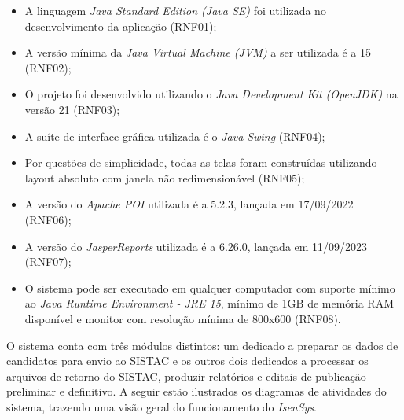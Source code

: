\documentclass[
	12pt,			%
	openright,		%
	oneside,	
	a4paper,		%
	english,		%
	brazil			%
]{abntex2/abntex2}  %
\begin{document}
		\begin{itemize}
			
			\item A linguagem \textit{Java Standard Edition (Java SE)} foi utilizada no desenvolvimento da aplicação (RNF01);
			\item A versão mínima da \textit{Java Virtual Machine (JVM)} a ser utilizada é a 15 (RNF02);
			\item O projeto foi desenvolvido utilizando o \textit{Java Development Kit (OpenJDK)} na versão 21 (RNF03);
			\item A suíte de interface gráfica utilizada é o \textit{Java Swing} (RNF04);
			\item Por questões de simplicidade, todas as telas foram construídas utilizando layout absoluto com janela não redimensionável (RNF05);
			\item A versão do \textit{Apache POI} utilizada é a 5.2.3, lançada em 17/09/2022 (RNF06);
			\item A versão do \textit{JasperReports\textregistered} utilizada é a 6.26.0, lançada em 11/09/2023 (RNF07);
			\item O sistema pode ser executado em qualquer computador com suporte mínimo ao \textit{Java Runtime Environment - JRE 15}, mínimo de 1GB de memória RAM disponível e monitor com resolução mínima de 800x600 (RNF08).
			
		\end{itemize}
	
		O sistema conta com três módulos distintos: um dedicado a preparar os dados de candidatos para envio ao SISTAC e os outros dois dedicados a processar os arquivos de retorno do SISTAC, produzir relatórios e editais de publicação preliminar e definitivo. A seguir estão ilustrados os diagramas de atividades do sistema, trazendo uma visão geral do funcionamento do \textit{IsenSys}.
		
\end{document}
